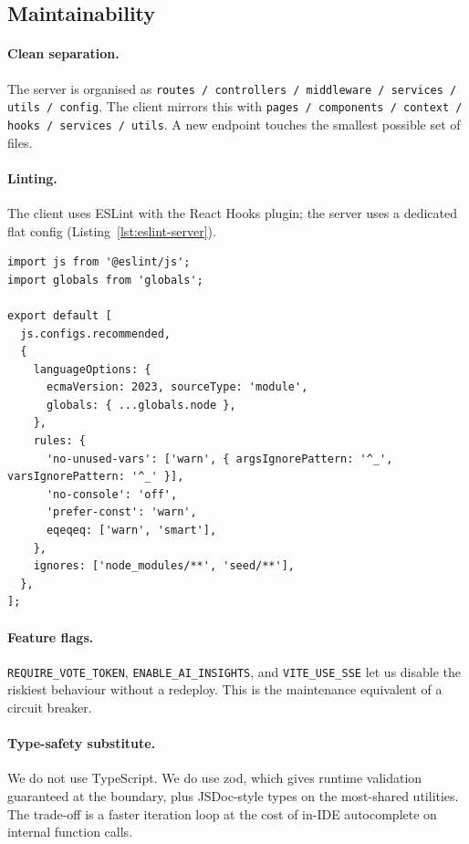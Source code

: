 \subsection{Maintainability}

\paragraph{Clean separation.} The server is organised as
\texttt{routes / controllers / middleware / services / utils / config}.
The client mirrors this with \texttt{pages / components / context /
hooks / services / utils}. A new endpoint touches the smallest possible
set of files.

\paragraph{Linting.} The client uses ESLint with the React Hooks plugin;
the server uses a dedicated flat config (Listing~\ref{lst:eslint-server}).

\begin{lstlisting}[caption={\texttt{server/eslint.config.js}},label={lst:eslint-server}]
import js from '@eslint/js';
import globals from 'globals';

export default [
  js.configs.recommended,
  {
    languageOptions: {
      ecmaVersion: 2023, sourceType: 'module',
      globals: { ...globals.node },
    },
    rules: {
      'no-unused-vars': ['warn', { argsIgnorePattern: '^_', varsIgnorePattern: '^_' }],
      'no-console': 'off',
      'prefer-const': 'warn',
      eqeqeq: ['warn', 'smart'],
    },
    ignores: ['node_modules/**', 'seed/**'],
  },
];
\end{lstlisting}

\paragraph{Feature flags.} \texttt{REQUIRE\_VOTE\_TOKEN},
\texttt{ENABLE\_AI\_INSIGHTS}, and \texttt{VITE\_USE\_SSE} let us
disable the riskiest behaviour without a redeploy. This is the
maintenance equivalent of a circuit breaker.

\paragraph{Type-safety substitute.} We do not use TypeScript. We do use
zod, which gives runtime validation guaranteed at the boundary, plus
JSDoc-style types on the most-shared utilities. The trade-off is a
faster iteration loop at the cost of in-IDE autocomplete on internal
function calls.

